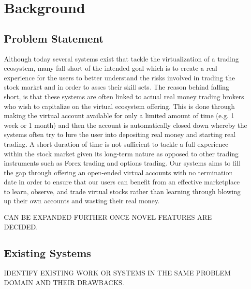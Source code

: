 
\section{Background}
    \label{sec:background}

\subsection{Problem Statement}
    \label{subsec:problem_statement}
    
Although today several systems exist that tackle the virtualization of a trading ecosystem, many fall short of the intended goal which is to create a real experience for the users to better understand the risks involved in trading the stock market and in order to asses their skill sets. The reason behind falling short, is that these systems are often linked to actual real money trading brokers who wish to capitalize on the virtual ecosystem offering. This is done through making the virtual account available for only a limited amount of time (e.g. 1 week or 1 month) and then the account is automatically closed down whereby the systems often try to lure the user into depositing real money and starting real trading. A short duration of time is not sufficient to tackle a full experience within the stock market given its long-term nature as opposed to other trading instruments such as Forex trading and options trading. Our systems aims to fill the gap through offering an open-ended virtual accounts with no termination date in order to ensure that our users can benefit from an effective marketplace to learn, observe, and trade virtual stocks rather than learning through blowing up their own accounts and wasting their real money.

{\color{red} CAN BE EXPANDED FURTHER ONCE NOVEL FEATURES ARE DECIDED.}

\subsection{Existing Systems}
    \label{subsec:existing_systems}
    
{\color{red} IDENTIFY EXISTING WORK OR SYSTEMS IN THE SAME PROBLEM DOMAIN AND THEIR DRAWBACKS.}